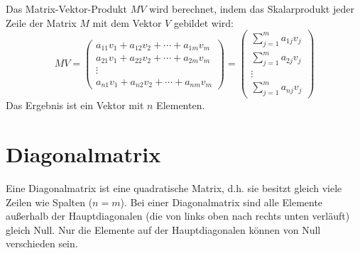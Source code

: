 Das Matrix-Vektor-Produkt $MV$ wird berechnet, indem das Skalarprodukt jeder
Zeile der Matrix $M$ mit dem Vektor $V$ gebildet wird:
\[
   MV = \begin{pmatrix}
      a_{11}v_1 + a_{12}v_2 + \cdots + a_{1m}v_m \\
      a_{21}v_1 + a_{22}v_2 + \cdots + a_{2m}v_m \\
      \vdots                                     \\
      a_{n1}v_1 + a_{n2}v_2 + \cdots + a_{nm}v_m
   \end{pmatrix} = \begin{pmatrix} \sum_{j=1}^{m} a_{1j}v_j \\ \sum_{j=1}^{m} a_{2j}v_j \\ \vdots \\ \sum_{j=1}^{m} a_{nj}v_j \end{pmatrix}
\]
Das Ergebnis ist ein Vektor mit $n$ Elementen.

\section{Diagonalmatrix}

Eine Diagonalmatrix ist eine quadratische Matrix, d.h. sie besitzt gleich viele
Zeilen wie Spalten ($n=m$). Bei einer Diagonalmatrix sind alle Elemente
außerhalb der Hauptdiagonalen (die von links oben nach rechts unten verläuft)
gleich Null. Nur die Elemente auf der Hauptdiagonalen können von Null
verschieden sein.

